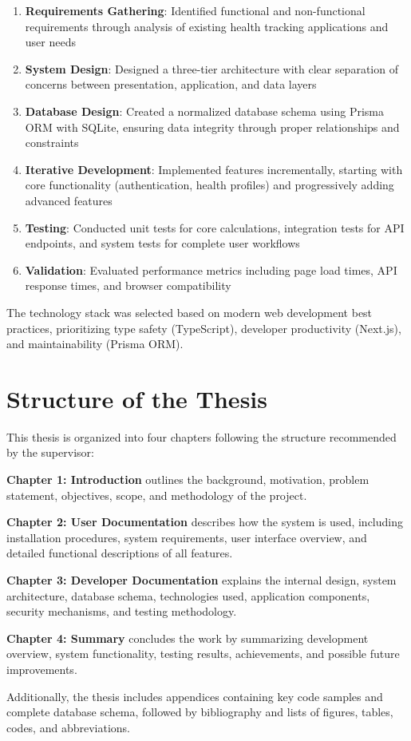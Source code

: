 \begin{enumerate}
    \item \textbf{Requirements Gathering}: Identified functional and non-functional requirements through analysis of existing health tracking applications and user needs
    \item \textbf{System Design}: Designed a three-tier architecture with clear separation of concerns between presentation, application, and data layers
    \item \textbf{Database Design}: Created a normalized database schema using Prisma ORM with SQLite, ensuring data integrity through proper relationships and constraints
    \item \textbf{Iterative Development}: Implemented features incrementally, starting with core functionality (authentication, health profiles) and progressively adding advanced features
    \item \textbf{Testing}: Conducted unit tests for core calculations, integration tests for API endpoints, and system tests for complete user workflows
    \item \textbf{Validation}: Evaluated performance metrics including page load times, API response times, and browser compatibility
\end{enumerate}

The technology stack was selected based on modern web development best practices, prioritizing type safety (TypeScript), developer productivity (Next.js), and maintainability (Prisma ORM).

\section{Structure of the Thesis}

This thesis is organized into four chapters following the structure recommended by the supervisor:

\textbf{Chapter 1: Introduction} outlines the background, motivation, problem statement, objectives, scope, and methodology of the project.

\textbf{Chapter 2: User Documentation} describes how the system is used, including installation procedures, system requirements, user interface overview, and detailed functional descriptions of all features.

\textbf{Chapter 3: Developer Documentation} explains the internal design, system architecture, database schema, technologies used, application components, security mechanisms, and testing methodology.

\textbf{Chapter 4: Summary} concludes the work by summarizing development overview, system functionality, testing results, achievements, and possible future improvements.

Additionally, the thesis includes appendices containing key code samples and complete database schema, followed by bibliography and lists of figures, tables, codes, and abbreviations.
